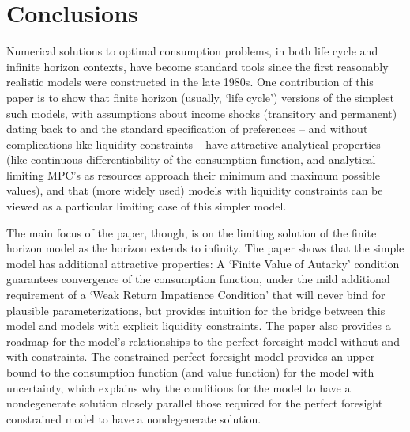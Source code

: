 \documentclass[BufferStockTheory]{subfiles}
\begin{document}

\hypertarget{Conclusions}{}
\section{Conclusions}

Numerical solutions to optimal consumption problems, in both life cycle and infinite horizon contexts, have become standard tools since the first reasonably realistic models were constructed in the late 1980s. One contribution of this paper is to show that finite horizon (usually, `life cycle') versions of the simplest such models, with assumptions about income shocks (transitory and permanent) dating back to \cite{friedmanATheory} and the standard specification of preferences -- and without complications like liquidity constraints -- have attractive analytical properties (like continuous differentiability of the consumption function, and analytical limiting MPC's as resources approach their minimum and maximum possible values), and that (more widely used) models with liquidity constraints can be viewed as a particular limiting case of this simpler model.

The main focus of the paper, though, is on the limiting solution of the finite horizon model as the horizon extends to infinity.  The paper shows that the simple model has additional attractive properties: A \href{https://econ-ark.github.io/BufferStockTheory#FVAC}{}`Finite Value of Autarky' condition guarantees convergence of the consumption function, under the mild additional requirement of a `Weak Return Impatience Condition' that will never bind for plausible parameterizations, but provides intuition for the bridge between this model and models with explicit liquidity constraints. The paper also provides a roadmap for the model's relationships to the perfect foresight model without and with constraints.  The constrained perfect foresight model provides an upper bound to the consumption function (and value function) for the model with uncertainty, which explains why the conditions for the model to have a nondegenerate solution closely parallel those required for the perfect foresight constrained model to have a nondegenerate solution.
\end{document}
